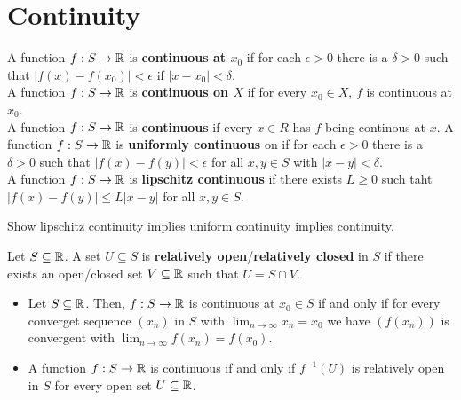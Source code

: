 \section{Continuity}
\begin{definition}[ Continuity]
	A function \(f:S \to \mathbb{R}\) is \textbf{continuous at \(x_0\)} if for each \(\epsilon > 0\) there is a \(\delta > 0\) such that \(\left| f\left( x \right)  - f\left( x_0 \right)  \right| < \epsilon\) if \(\left| x - x_0 \right|  < \delta\).\\
	A function \(f:S \to \mathbb{R}\) is \textbf{continuous on \(X\)} if for every \(x_0 \in X \), \(f\) is continuous at \(x_0\).\\
	A function \(f:S \to \mathbb{R}\) is \textbf{continuous} if every \(x \in R\) has \(f\) being continous at \(x\).
	A function \(f: S \to \mathbb{R}\) is \textbf{uniformly continuous} on if for each \(\epsilon > 0\) there is a \(\delta > 0\) such that \(\left| f\left( x \right) - f\left( y \right)  \right| < \epsilon\) for all \(x, y \in S\) with \(\left| x - y \right|  < \delta\).\\
	A function  \(f : S \to \mathbb{R}\) is \textbf{lipschitz continuous} if there exists \(L \ge  0\) such taht \(\left| f\left( x \right) - f\left( y \right)  \right|  \le L \left| x- y \right| \) for all \(x, y \in S\).
\end{definition}
\begin{problem}
	Show lipschitz continuity implies uniform continuity implies continuity.
\end{problem}
\begin{definition}[]
	Let \(S\subseteq \mathbb{R}\). A set \(U \subseteq S\) is \textbf{relatively open}/\textbf{relatively closed} in \(S\) if there exists an open/closed set \(V \subseteq \mathbb{R}\) such that \(U = S \cap V\).
\end{definition}
\begin{proposition}
	\begin{itemize}
\item Let \(S \subseteq \mathbb{R}\). Then, \(f:S \to \mathbb{R}\) is continuous at \(x_0 \in S\) if and only if for every converget sequence \(\left( x_{n} \right) \) in \(S\) with \(\lim_{n \to \infty}x_{n} = x_0\) we have \(\left( f\left( x_{n} \right)  \right) \) is convergent with \(\lim_{n \to \infty}f\left( x_{n} \right)  = f\left( x_0 \right) \).
\item A function \(f: S \to \mathbb{R}\) is continuous if and only if \(f^{-1} \left( U \right) \) is relatively open in \(S\) for every open set \(U\subseteq \mathbb{R}\).
	\end{itemize}
\end{proposition}

